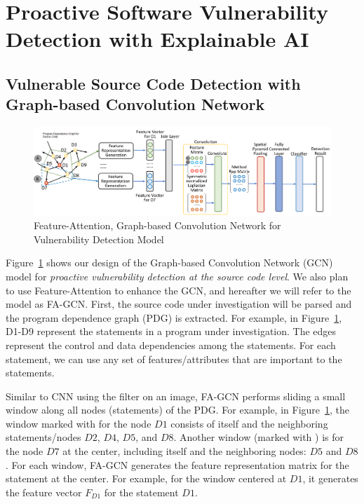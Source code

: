 \section{Proactive Software Vulnerability Detection with Explainable AI}
\label{sec:thrust1}

\subsection{Vulnerable Source Code Detection with Graph-based Convolution Network} \label{sec:vd}

\begin{figure}[!hbt]
    \centering
    \includegraphics[width=6.5in]{graph-based-CNN.png}
    \caption{Feature-Attention, Graph-based Convolution Network for
      Vulnerability Detection Model}
    \label{fig:detection-model}
\end{figure}

Figure~\ref{fig:detection-model} shows our design of the Graph-based
Convolution Network (GCN) model for {\em proactive vulnerability
  detection at the source code level}. We also plan to use
Feature-Attention to enhance the GCN, and hereafter we will refer to
the model as FA-GCN. First, the source code under investigation will
be parsed and the program dependence graph (PDG) is extracted.  For
example, in Figure~\ref{fig:detection-model}, D1-D9 represent the
statements in a program under investigation. The edges represent the
control and data dependencies among the statements. For each
statement, we can use any set of features/attributes that are
important to the statements.


Similar to CNN using the filter on an image, FA-GCN performs sliding a
small window along all nodes (statements) of the PDG. For example, in
Figure~\ref{fig:detection-model}, the window marked with 
for the node $D1$ consists of itself and the neighboring
statements/nodes $D2$, $D4$, $D5$, and $D8$. Another window (marked
with ) is for the node $D7$ at the center, including itself
and the neighboring nodes: $D5$ and $D8$. For each window, FA-GCN
generates the feature representation matrix for the statement at the
center. For example, for the window centered at $D1$, it generates the
feature vector $F_{D1}$ for the statement $D1$. 

